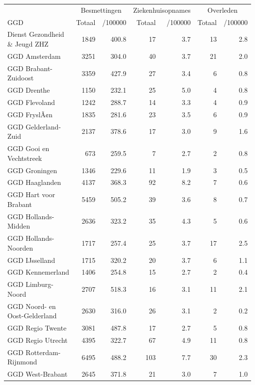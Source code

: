\documentclass[
  english,
  man,floatsintext]{apa6}
\begin{document}
\begin{table}
\centering\begingroup\fontsize{10}{12}\selectfont

\begin{threeparttable}
\begin{tabular}{lrrrrrr}
\toprule
\multicolumn{1}{c}{ } & \multicolumn{2}{c}{Besmettingen} & \multicolumn{2}{c}{Ziekenhuisopnames} & \multicolumn{2}{c}{Overleden} \\
\cmidrule(l{3pt}r{3pt}){2-3} \cmidrule(l{3pt}r{3pt}){4-5} \cmidrule(l{3pt}r{3pt}){6-7}
GGD & Totaal & /100000 & Totaal & /100000 & Totaal & /100000\\
\midrule
Dienst Gezondheid \& Jeugd ZHZ & 1849 & 400.8 & 17 & 3.7 & 13 & 2.8\\
GGD Amsterdam & 3251 & 304.0 & 40 & 3.7 & 21 & 2.0\\
GGD Brabant-Zuidoost & 3359 & 427.9 & 27 & 3.4 & 6 & 0.8\\
GGD Drenthe & 1150 & 232.1 & 25 & 5.0 & 4 & 0.8\\
GGD Flevoland & 1242 & 288.7 & 14 & 3.3 & 4 & 0.9\\
GGD FryslÃ¢n & 1835 & 281.6 & 23 & 3.5 & 6 & 0.9\\
GGD Gelderland-Zuid & 2137 & 378.6 & 17 & 3.0 & 9 & 1.6\\
GGD Gooi en Vechtstreek & 673 & 259.5 & 7 & 2.7 & 2 & 0.8\\
GGD Groningen & 1346 & 229.6 & 11 & 1.9 & 3 & 0.5\\
GGD Haaglanden & 4137 & 368.3 & 92 & 8.2 & 7 & 0.6\\
GGD Hart voor Brabant & 5459 & 505.2 & 39 & 3.6 & 8 & 0.7\\
GGD Hollands-Midden & 2636 & 323.2 & 35 & 4.3 & 5 & 0.6\\
GGD Hollands-Noorden & 1717 & 257.4 & 25 & 3.7 & 17 & 2.5\\
GGD IJsselland & 1715 & 320.2 & 20 & 3.7 & 6 & 1.1\\
GGD Kennemerland & 1406 & 254.8 & 15 & 2.7 & 2 & 0.4\\
GGD Limburg-Noord & 2707 & 518.3 & 16 & 3.1 & 11 & 2.1\\
GGD Noord- en Oost-Gelderland & 2630 & 316.0 & 26 & 3.1 & 2 & 0.2\\
GGD Regio Twente & 3081 & 487.8 & 17 & 2.7 & 5 & 0.8\\
GGD Regio Utrecht & 4395 & 322.7 & 67 & 4.9 & 11 & 0.8\\
GGD Rotterdam-Rijnmond & 6495 & 488.2 & 103 & 7.7 & 30 & 2.3\\
GGD West-Brabant & 2645 & 371.8 & 21 & 3.0 & 7 & 1.0\\

\end{tabular}
\end{threeparttable}
\end{table}
\end{document}
